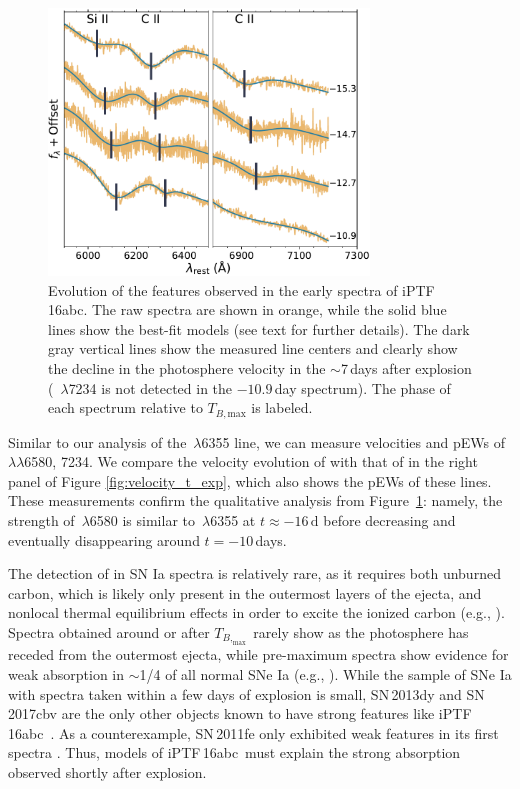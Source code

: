 \documentclass[twocolumn]{aastex61}
\newcommand{\abc}{iPTF\,16abc}
\begin{document}
\begin{figure}[]
  \centering
  \includegraphics[width=3.35in]{CarbonFeature.pdf}
  \caption{ Evolution of the  features observed in the early
  spectra of \abc. The raw spectra are shown in orange, while the solid blue
  lines show the best-fit models (see text for further details). The dark
  gray vertical lines show the measured line centers and clearly show the
  decline in the photosphere velocity in the $\sim$7\,days after explosion (
  \,$\lambda$7234 is not detected in the $-10.9$\,day spectrum).
  The phase of each spectrum relative to $T_{B,\mathrm{max}}$ is labeled. }
  \label{fig:carbon}
\end{figure}

Similar to our analysis of the \,$\lambda$6355 line, we can
measure velocities and pEWs of \,$\lambda\lambda$6580, 7234. We
compare the velocity evolution of  with that of  in the
right panel of Figure \ref{fig:velocity_t_exp}, which also shows the pEWs of
these lines. These measurements confirm the qualitative analysis from
Figure~\ref{fig:carbon}: namely, the strength of \,$\lambda$6580
is similar to \,$\lambda$6355 at $t \approx -16 \, \mathrm{d}$
before decreasing and eventually disappearing around $t = -10$\,days.

The detection of  in SN Ia spectra is relatively rare, as it
requires both unburned carbon, which is likely only present in the outermost
layers of the ejecta, and nonlocal thermal equilibrium effects in order to
excite the ionized carbon (e.g., \citealt{2007ApJ...654L..53T}). Spectra
obtained around or after $T_{B,_\mathrm{max}}$ rarely show  as the
photosphere has receded from the outermost ejecta, while pre-maximum spectra
show evidence for weak  absorption in $\sim$1/4 of all normal SNe
Ia (e.g.,
\citealt{2011ApJ...732...30P,2011ApJ...743...27T,2012MNRAS.425.1917S}).
While the sample of SNe Ia with spectra taken within a few days of explosion
is small, SN\,2013dy and SN\,2017cbv are the only other objects known to
have strong  features like \abc\
\citep{2013ApJ...778L..15Z,2017ApJ...845L..11H}. As a counterexample,
SN\,2011fe only exhibited weak  features in its first spectra
\citep{2012ApJ...752L..26P}. Thus, models of \abc\ must explain the strong
\ion{C}{2} absorption observed shortly after explosion.
\end{document}
